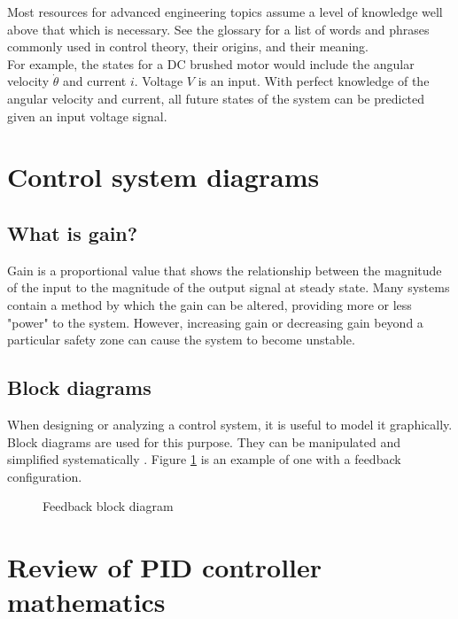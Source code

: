 \documentclass[10pt,conference,compsoc]{IEEEtran}
\begin{document}
Most resources for advanced engineering topics assume a level of knowledge well
above that which is necessary. See the glossary for a list of words and phrases
commonly used in control theory, their origins, and their meaning. \\

For example, the \glspl{state} for a DC brushed motor would include the angular
velocity $\dot{\theta}$ and current $i$. Voltage $V$ is an input. With perfect
knowledge of the angular velocity and current, all future \glspl{state} of the
\gls{system} can be predicted given an input voltage signal. \\

\section{Control system diagrams}

\subsection{What is gain?}

Gain is a proportional value that shows the relationship between the magnitude
of the input to the magnitude of the output signal at steady state. Many
\glspl{system} contain a method by which the gain can be altered, providing more
or less "power" to the \gls{system}. However, increasing gain or decreasing gain
beyond a particular safety zone can cause the \gls{system} to become unstable.

\subsection{Block diagrams}

When designing or analyzing a control system, it is useful to model it
graphically. Block diagrams are used for this purpose. They can be manipulated
and simplified systematically \cite{bib:block_diagrams}. Figure
\ref{fig:feedback_loop} is an example of one with a feedback configuration.

\begin{figure}[H]
  \centering
  \def\svgwidth{0.5\columnwidth}
  
  \caption{Feedback block diagram}
  \label{fig:feedback_loop}
\end{figure}

\section{Review of PID controller mathematics}
\end{document}
